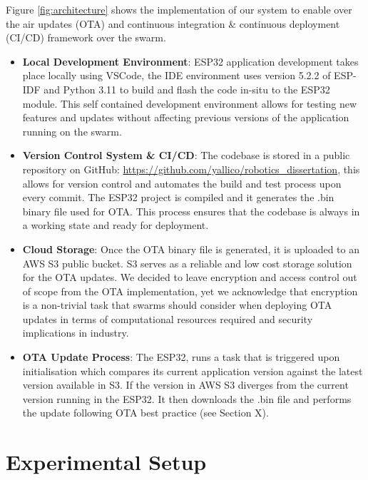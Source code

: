 \documentclass{report}
\begin{document}
Figure \ref{fig:architecture} shows the implementation of our system to enable over the air updates (OTA) and continuous integration \& continuous deployment (CI/CD) framework over the swarm. 
\begin{itemize}
    \item \textbf{Local Development Environment}: ESP32 application development takes place locally using VSCode, the IDE environment uses version 5.2.2 of ESP-IDF and Python 3.11 to build and flash the code in-situ to the ESP32 module. This self contained development environment allows for testing new features and updates without affecting previous versions of the application running on the swarm.
    \item \textbf{Version Control System \& CI/CD}: The codebase is stored in a public repository on GitHub: \url{https://github.com/yallico/robotics_dissertation}, this allows for version control and automates the build and test process upon every commit. The ESP32 project is compiled and it generates the .bin binary file used for OTA. This process ensures that the codebase is always in a working state and ready for deployment.
    \item \textbf{Cloud Storage}: Once the OTA binary file is generated, it is uploaded to an AWS S3 public bucket. S3 serves as a reliable and low cost storage solution for the OTA updates. We decided to leave encryption and access control out of scope from the OTA implementation, yet we acknowledge that encryption is a non-trivial task that swarms should consider when deploying OTA updates in terms of computational resources required and security implications in industry. %
    \item \textbf{OTA Update Process}: The ESP32, runs a task that is triggered upon initialisation which compares its current application version against the latest version available in S3. If the version in AWS S3 diverges from the current version running in the ESP32. It then downloads the .bin file and performs the update following OTA best practice (see Section X). %

\end{itemize}


\section{Experimental Setup}
\lipsum[5-6] %


\newpage
\printbibliography
\end{document}
